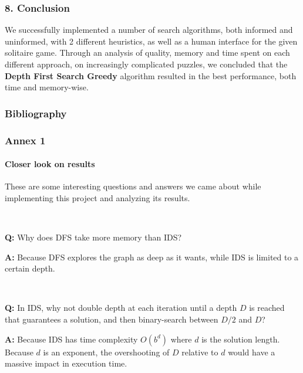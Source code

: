 \documentclass{beamer}
\begin{document}
\begin{frame}
\frametitle{8. Conclusion}

We successfully implemented a number of search algorithms, both informed and uninformed, with 2 different heuristics, as well as a human interface for the given solitaire game. 
Through an analysis of quality, memory and time spent on each different approach, on increasingly complicated puzzles, we concluded that the \textbf{Depth First Search Greedy} algorithm resulted in the best performance, both time and memory-wise.


\end{frame}

\begin{frame}
  \frametitle{Bibliography}
  
  
  
\end{frame}

\begin{frame}
  \frametitle{Annex 1}
  \framesubtitle{Closer look on results}

  These are some interesting questions and answers we came about while implementing this project and analyzing its results.

  ~
  
  \textbf{Q:} Why does DFS take more memory than IDS?
  
  \textbf{A:} Because DFS explores the graph as deep as it wants, while IDS is limited to a certain depth.
  
  ~

  \textbf{Q:} In IDS, why not double depth at each iteration until a depth $D$ is reached that guarantees a solution, and then binary-search between $D/2$ and $D$?

  \textbf{A:} Because IDS has time complexity $O(b^d)$ where $d$ is the solution length. Because $d$ is an exponent, the overshooting of $D$ relative to $d$ would have a massive impact in execution time.

\end{frame}
\end{document}
